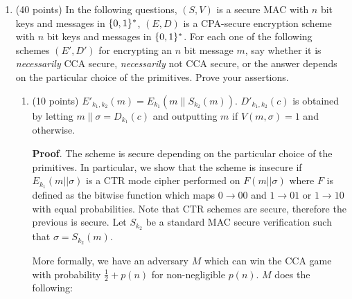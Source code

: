 \documentclass{article}
\begin{document}
\begin{enumerate}[,start=2]%

\item{}
(40 points) In the following questions, $(S,V)$ is a secure MAC with $n$ bit keys and messages in $\{0,1\}^*$, $(E,D)$ is a CPA-secure encryption scheme with $n$ bit keys and messages in $\{0,1\}^*$.
For each one of the following schemes $(E',D')$ for encrypting an $n$ bit message $m$, say whether it is \emph{necessarily} CCA secure, \emph{necessarily} not CCA secure, or the answer depends on the particular choice of the primitives. Prove your assertions.%

\begin{enumerate}[,label=\alph*.]%

\item{}
(10 points) $E'_{k_1,k_2}(m) = E_{k_1}(m\|S_{k_2}(m))$. $D'_{k_1,k_2}(c)$ is obtained by letting $m\|\sigma=D_{k_1}(c)$ and outputting $m$ if $V(m,\sigma)=1$ and   otherwise.%

\begin{mdbmarginx}{1ex}{0pt}{1ex}{0pt}%
\noindent{}\textbf{Proof}.  The scheme is secure depending on the particular choice of the primitives. In particular, we show that
the scheme is insecure if $E_{k_1}(m || \sigma )$ is a CTR mode cipher performed on $F(m || \sigma)$ where
$F$ is defined as the bitwise function which maps $0 \to 00$ and $1 \to 01$ or $1 \to 10$ with equal
probabilities. Note that CTR schemes are secure, therefore the previous is secure. Let $S_{k_2}$ be
a standard MAC secure verification such that $\sigma = S_{k_2}(m)$.%

More formally, we have an adversary $M$ which can win the CCA game with probability $\frac{1}{2} + p(n)$
for non-negligible $p(n)$. $M$ does the following:%


\end{mdbmarginx}
\end{enumerate}
\end{enumerate}
\end{document}
